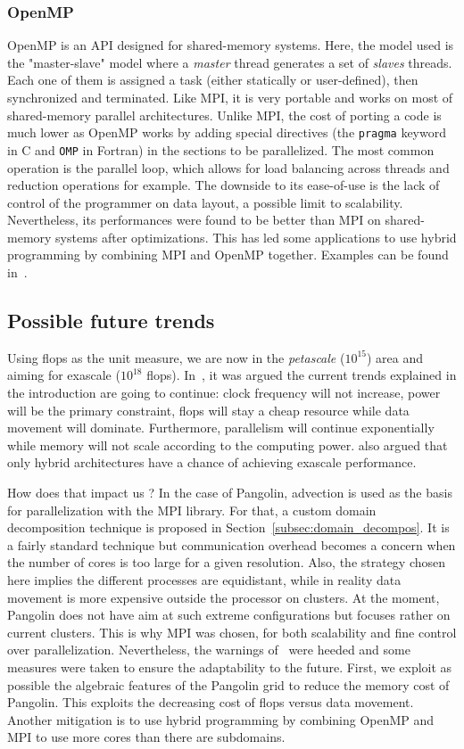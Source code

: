 \subsubsection{OpenMP}
\gls{OpenMP} is an \gls{API} designed for shared-memory systems. Here, the model
used is the "master-slave" model where a \textit{master} thread generates a set
of \textit{slaves} threads. Each one of them is assigned a task (either
statically or user-defined), then synchronized and terminated.  Like MPI, it is
very portable and works on most of shared-memory parallel architectures. Unlike
MPI, the cost of porting a code is much lower as OpenMP works by adding special
directives (the \texttt{pragma} keyword in C and \texttt{OMP} in Fortran) in the
sections to be parallelized. The most common operation is the parallel loop,
which allows for load balancing across threads and reduction operations for
example.
The downside to its ease-of-use is the lack of control of the programmer on data
layout, a possible limit to scalability. Nevertheless, its performances were
found to be better than MPI on shared-memory systems after optimizations. This
has led some applications to use hybrid programming by combining MPI
and OpenMP together. Examples can be found
in~\cite{Chorley2010,Jin2011,Guo2014}.

\subsection{Possible future trends}
Using flops as the unit measure, we are now in the \textit{petascale}
($10^{15}$) area and aiming for exascale ($10^{18}$ flops).
In~\cite{Perfect2004}, it was argued the current trends explained in the
introduction are going to continue: clock frequency will not increase, power
will be the primary constraint, flops will stay a cheap resource while data
movement will dominate. Furthermore, parallelism will
continue exponentially while memory will not scale according to the computing power.
\cite{Perfect2004} also argued that only hybrid architectures have a chance of
achieving exascale performance.

How does that impact us ? In the case of Pangolin, advection is used as the
basis for parallelization with the MPI library. For that, a custom domain decomposition
technique is proposed in Section~\ref{subsec:domain_decompos}. It is a fairly
standard technique but communication \gls{overhead} becomes a concern when the
number of cores is too large for a given resolution. Also, the strategy chosen
here implies the different processes are equidistant, while in reality data
movement is more expensive outside the processor on clusters.  At the moment,
Pangolin does not have aim at such extreme configurations but focuses rather on
current clusters. This is why MPI was chosen, for both scalability and fine
control over parallelization.  Nevertheless, the warnings of~\cite{Perfect2004}
were heeded and some measures were taken to ensure the adaptability to the
future. First, we exploit as possible the algebraic features of the Pangolin
grid to reduce the memory cost of Pangolin.  This exploits the decreasing cost
of flops versus data movement. Another mitigation is to use hybrid programming
by combining OpenMP and MPI to use more cores than there are subdomains.

